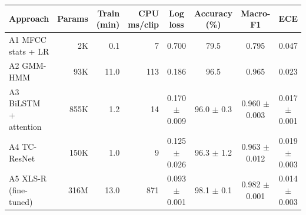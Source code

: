 \begin{tabular}{@{}lrrrcccc@{}}
\toprule
Approach & Params & Train (min) & CPU ms/clip & Log loss & Accuracy (\%) & Macro-F1 & ECE \\
\midrule
A1 MFCC stats + LR & 2K & 0.1 & 7 & 0.700 & 79.5 & 0.795 & 0.047 \\
A2 GMM-HMM & 93K & 11.0 & 113 & 0.186 & 96.5 & 0.965 & 0.023 \\
A3 BiLSTM + attention & 855K & 1.2 & 14 & 0.170 $\pm$ 0.009 & 96.0 $\pm$ 0.3 & 0.960 $\pm$ 0.003 & 0.017 $\pm$ 0.001 \\
A4 TC-ResNet & 150K & 1.0 & 9 & 0.125 $\pm$ 0.026 & 96.3 $\pm$ 1.2 & 0.963 $\pm$ 0.012 & 0.019 $\pm$ 0.003 \\
A5 XLS-R (fine-tuned) & 316M & 13.0 & 871 & 0.093 $\pm$ 0.001 & 98.1 $\pm$ 0.1 & 0.982 $\pm$ 0.001 & 0.014 $\pm$ 0.003 \\
\bottomrule
\end{tabular}
